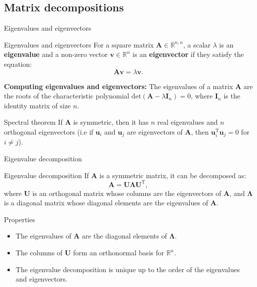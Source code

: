 \documentclass[aspectratio=1610]{beamer}
\begin{document}
\subsection{Matrix decompositions}

\begin{frame}{Eigenvalues and eigenvectors}

  \begin{block}{Eigenvalues and eigenvectors}
    For a square matrix $\mathbf{A}\in\mathbb{R}^{n,n}$, a scalar $\lambda$ is an \textbf{eigenvalue} and a non-zero vector $\mathbf{v}\in\mathbb{R}^n$ is an \textbf{eigenvector} if they satisfy the equation:
    $$\mathbf{A}\mathbf{v} = \lambda \mathbf{v}.$$
  \end{block}

  \textbf{Computing eigenvalues and eigenvectors:} The eigenvalues of a matrix $\mathbf{A}$ are the roots of the characteristic polynomial $\mathrm{det}(\mathbf{A} - \lambda \mathbf{I}_n) = 0$, where $\mathbf{I}_n$ is the identity matrix of size $n$.


  \begin{block}{Spectral theorem}
    If $\mathbf{A}$ is symmetric, then it has $n$ real eigenvalues and $n$ orthogonal eigenvectors (i.e if $\mathbf{u}_i$ and $\mathbf{u}_j$ are eigenvectors of $\mathbf{A}$, then $\mathbf{u}_i^\mathrm{T}\mathbf{u}_j = 0$ for $i\neq j$).
  \end{block}
\end{frame}


\begin{frame}{Eigenvalue decomposition}

  \begin{block}{Eigenvalue decomposition}
    If $\mathbf{A}$ is a symmetric matrix, it can be decomposed as:
    $$\mathbf{A} = \mathbf{U}\boldsymbol{\Lambda}\mathbf{U}^\mathrm{T},$$
    where $\mathbf{U}$ is an orthogonal matrix whose columns are the eigenvectors of $\mathbf{A}$, and $\boldsymbol{\Lambda}$ is a diagonal matrix whose diagonal elements are the eigenvalues of $\mathbf{A}$.
  \end{block}

  \begin{block}{Properties}
    \begin{itemize}
      \item The eigenvalues of $\mathbf{A}$ are the diagonal elements of $\boldsymbol{\Lambda}$.
      \item The columns of $\mathbf{U}$ form an orthonormal basis for $\mathbb{R}^n$.
      \item The eigenvalue decomposition is unique up to the order of the eigenvalues and eigenvectors.
    \end{itemize}
  \end{block}
\end{frame}
\end{document}
